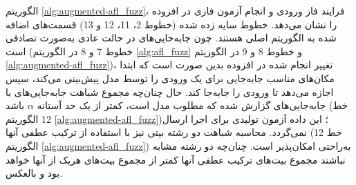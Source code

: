  الگوریتم \ref{alg:augmented-afl_fuzz}، فرایند فاز ورودی و انجام آزمون فازی در افزوده را نشان ‌می‌دهد. خطوط سایه زده شده (خطوط 2، 11، 12 و 13) قسمت‌های اضافه شده به الگوریتم اصلی   هستند. 
 چون جابه‌حایی‌های  در حالت عادی به‌صورت تصادفی است (خطوط 7 و 8 در الگوریتم \ref{alg:afl_fuzz} و خطوط 8 و 9 در الگوریتم \ref{alg:augmented-afl_fuzz})،
  تغییر انجام شده در افزوده بدین صورت است که ابتدا مکان‌های مناسب جابه‌جایی برای یک ورودی را توسط مدل پیش‌بینی می‌کند، سپس اجازه می‌دهد تا   ورودی را جابه‌جا کند. 
  حال چنان‌چه مجموع شباهت جابه‌جایی‌های  با جابه‌جایی‌های گزارش شده که مطلوب مدل است، کمتر از یک حد آستانه $ \alpha$  باشد (خط 12 الگوریتم \ref{alg:augmented-afl_fuzz})؛
  این داده آزمون تولیدی برای اجرا ارسال نمی‌گردد. محاسبه شباهت دو رشته بیتی نیز با استفاده از ترکیب عطفی آنها (خط 12 الگوریتم \ref{alg:augmented-afl_fuzz}) به‌‌راحتی امکان‌پذیر است. چنان‌چه دو رشته مشابه نباشند مجموع بیت‌های ترکیب عطفی آنها کمتر از مجموع بیت‌های هریک از  آنها خواهد بود و بالعکس.
  
